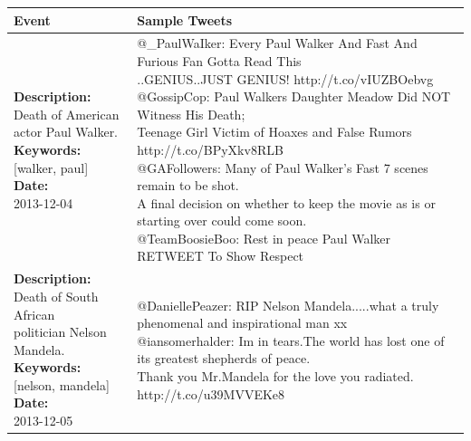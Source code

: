 \documentclass[10pt,letterpaper]{article}
\begin{document}
\begin{table}
  \centering
  {\scriptsize
    \begin{tabular*}{1\linewidth}{p{5cm}p{5cm}}
      \hline
      Event & Sample Tweets \\
      \hline
      \pbox{20cm}{\textbf{Description:}\\ Death of American\\actor Paul Walker. \vspace{.1cm}\\
        \textbf{Keywords:}\\ {[}walker, paul{]}\vspace{.1cm}\\
        \textbf{Date:}\\ 2013-12-04}
      & \pbox{20cm}{
        @\_PaulWaIker: Every Paul Walker And Fast And Furious Fan Gotta Read This\\..GENIUS..JUST GENIUS! http://t.co/vIUZBOebvg\vspace{.1cm}\\
        @GossipCop: Paul Walkers Daughter Meadow Did NOT Witness His Death;\\ Teenage Girl Victim of Hoaxes and False Rumors http://t.co/BPyXkv8RLB\vspace{.1cm}\\
        @GAFollowers: Many of Paul Walker's Fast 7 scenes remain to be shot.\\ A final decision on whether to keep the movie as is or starting over could come soon.\vspace{.1cm}\\
        @TeamBoosieBoo: Rest in peace Paul Walker  RETWEET To Show Respect
      }
      \\
     \hline
      \pbox{20cm}{\textbf{Description:}\\ Death of South African\\ politician Nelson Mandela. \vspace{.1cm}\\
        \textbf{Keywords:}\\ {[}nelson, mandela{]}\vspace{.1cm}\\
        \textbf{Date:}\\ 2013-12-05}
      & \pbox{20cm}{
        @DaniellePeazer: RIP Nelson Mandela.....what a truly phenomenal and inspirational man xx\vspace{.1cm}\\
        @iansomerhalder: Im in tears.The world has lost one of its greatest shepherds of peace.\\Thank you Mr.Mandela for the love you radiated. http://t.co/u39MVVEKe8\vspace{.1cm}\\
}
\end{tabular*}}
\end{table}
\end{document}
